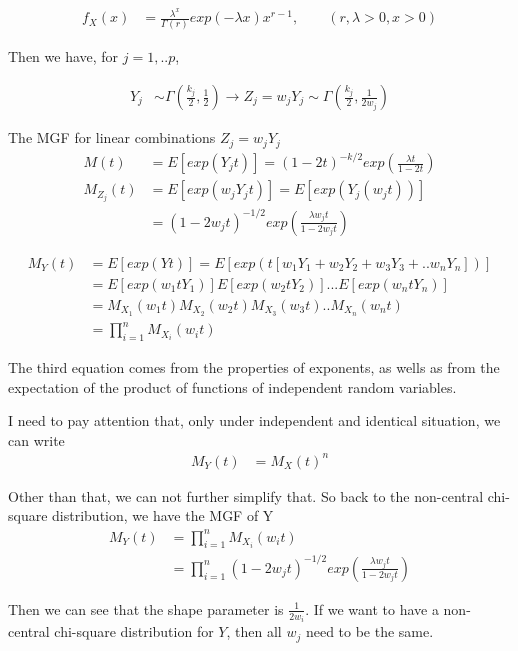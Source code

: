 \documentclass[11pt]{article} %
\begin{document}
\begin{align*}
	f_{X}(x) &= \frac{\lambda^x}{\Gamma (r)} exp(- \lambda x) x^{r-1}, \qquad (r, \lambda >0, x >0)
\end{align*}

Then we have, for $j=1,..p$,

\begin{align*}
	Y_j & \sim  \Gamma(\frac{k_j}{2}, \frac{1}{2}) \rightarrow Z_j = w_j Y_j \sim \Gamma(\frac{k_j}{2}, \frac{1}{2w_j})
\end{align*}

The MGF for linear combinations $Z_j = w_j Y_j$
\begin{align*}
	M(t) &= E[exp(Y_j t)] = (1-2t)^{-k/2} exp \left( \frac{ \lambda t }{1-2t} \right)\\
	M_{Z_j} (t) & = E[exp(w_j Y_j t)] = E[exp( Y_j (w_jt))] \\
	&= (1-2 w_jt)^{-1/2} exp \left( \frac{ \lambda w_j t }{1-2 w_j t} \right)
\end{align*}

\begin{align*}
	M_Y(t) &= E[exp(Y t)] = E[exp(t [w_1 Y_1 + w_2 Y_2 + w_3 Y_3 +.. w_n Y_n])]\\
	&= E[exp(w_1 t Y_1)]E[exp(w_2 t Y_2)]... E[exp(w_n t Y_n)]\\
	&= M_{X_1}(w_1 t) M_{X_2}(w_2 t) M_{X_3}(w_3 t).. M_{X_n}(w_n t)\\
	&= \prod_{i=1}^n M_{X_i}(w_i t)
\end{align*}

The third equation comes from the properties of exponents, as wells as from the expectation of the product of functions of independent random variables. 

I need to pay attention that, only under independent and identical situation, we can write
 \begin{align*}
 	M_Y(t) &= M_{X}(t)^n
 \end{align*}

Other than that, we can not further simplify that. So back to the non-central chi-square distribution, we have the MGF of Y
\begin{align*}
	M_Y(t) &= \prod_{i=1}^n M_{X_i}(w_i t)\\
	&=\prod_{i=1}^n  (1-2 w_jt)^{-1/2} exp \left( \frac{ \lambda w_j t }{1-2 w_j t} \right)
\end{align*}

Then we can see that the shape parameter is $\frac{1}{2 w_i}$. If we want to have a non-central chi-square distribution for $Y$, then all $w_j$ need to be the same. 
\end{document}
